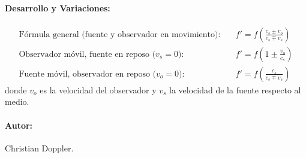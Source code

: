 \documentclass[12pt,a4paper]{article}
\begin{document}
\paragraph*{Desarrollo y Variaciones:}
\begin{align*}
\text{Fórmula general (fuente y observador en movimiento):} \quad & f' = f \left( \frac{c_s \pm v_o}{c_s \mp v_s} \right) \\
\text{Observador móvil, fuente en reposo ($v_s=0$):} \quad & f' = f \left( 1 \pm \frac{v_o}{c_s} \right) \\
\text{Fuente móvil, observador en reposo ($v_o=0$):} \quad & f' = f \left( \frac{c_s}{c_s \mp v_s} \right)
\end{align*}
donde $v_o$ es la velocidad del observador y $v_s$ la velocidad de la fuente respecto al medio.
\paragraph*{Autor:} Christian Doppler.
\end{document}
